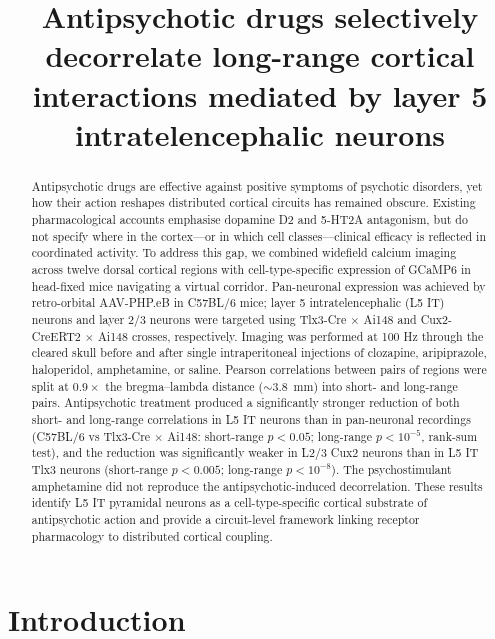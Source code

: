 \documentclass[11pt]{article}
\title{Antipsychotic drugs selectively decorrelate long-range cortical interactions mediated by layer 5 intratelencephalic neurons}
\author{}
\date{}
\begin{document}
\maketitle

\begin{abstract}
Antipsychotic drugs are effective against positive symptoms of psychotic disorders, yet how their action reshapes distributed cortical circuits has remained obscure. Existing pharmacological accounts emphasise dopamine D2 and 5-HT2A antagonism, but do not specify where in the cortex---or in which cell classes---clinical efficacy is reflected in coordinated activity. To address this gap, we combined widefield calcium imaging across twelve dorsal cortical regions with cell-type-specific expression of GCaMP6 in head-fixed mice navigating a virtual corridor. Pan-neuronal expression was achieved by retro-orbital AAV-PHP.eB in C57BL/6 mice; layer 5 intratelencephalic (L5 IT) neurons and layer 2/3 neurons were targeted using Tlx3-Cre $\times$ Ai148 and Cux2-CreERT2 $\times$ Ai148 crosses, respectively. Imaging was performed at 100 Hz through the cleared skull before and after single intraperitoneal injections of clozapine, aripiprazole, haloperidol, amphetamine, or saline. Pearson correlations between pairs of regions were split at $0.9\times$ the bregma--lambda distance (${\sim}3.8$~mm) into short- and long-range pairs. Antipsychotic treatment produced a significantly stronger reduction of both short- and long-range correlations in L5 IT neurons than in pan-neuronal recordings (C57BL/6 vs Tlx3-Cre $\times$ Ai148: short-range $p<0.05$; long-range $p<10^{-5}$, rank-sum test), and the reduction was significantly weaker in L2/3 Cux2 neurons than in L5 IT Tlx3 neurons (short-range $p<0.005$; long-range $p<10^{-8}$). The psychostimulant amphetamine did not reproduce the antipsychotic-induced decorrelation. These results identify L5 IT pyramidal neurons as a cell-type-specific cortical substrate of antipsychotic action and provide a circuit-level framework linking receptor pharmacology to distributed cortical coupling.
\end{abstract}

\section{Introduction}
\end{document}
